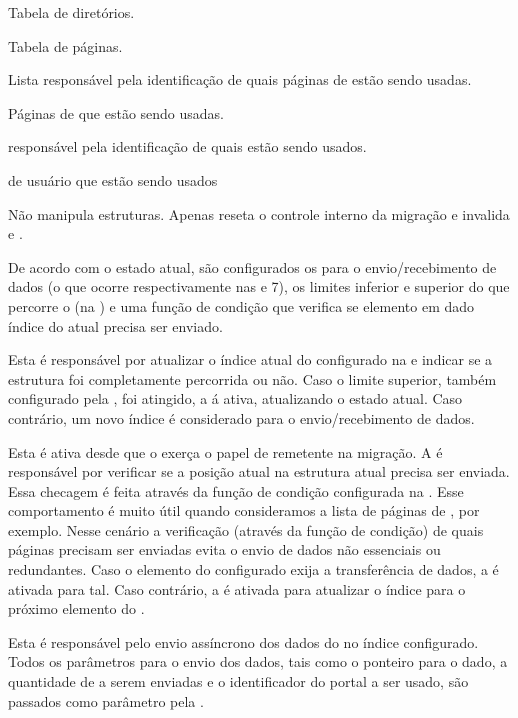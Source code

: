 \begin{description}[leftmargin=*,labelwidth=!,labelindent=0pt]
\begin{description}[leftmargin=!,labelwidth=\widthof{MSTATE\_FRAMES\_BITMAP \qquad}]
        \item [MSTATE\_PAGEDIR] Tabela de diretórios.
        \item [MSTATE\_PAGETAB] Tabela de páginas.
        \item [MSTATE\_KSTACKSIDS] Lista responsável pela identificação de quais páginas de  estão sendo usadas.
        \item [MSTATE\_KSTACKSPHYS] Páginas de  que estão sendo usadas.
        \item [MSTATE\_FRAMES\_BITMAP] \Bitmap responsável pela identificação de quais \frames estão sendo usados.
        \item [MSTATE\_FRAMES\_PHYS] \Frames de usuário que estão sendo usados
        \item [MSTATE\_FINISH] Não manipula estruturas. Apenas reseta o controle interno da migração e invalida \tlbs e \caches.
    \end{description}
    De acordo com o estado atual, são configurados os \buffers para o envio/recebimento de dados (o que ocorre respectivamente nas  e 7), os limites inferior e superior do \myloop que percorre o \buffer (na ) e uma função de condição que verifica se elemento em dado índice do \buffer atual precisa ser enviado.
    \item[5.] Esta \task é responsável por atualizar o índice atual do \buffer configurado na  e indicar se a estrutura foi completamente percorrida ou não. Caso o limite superior, também configurado pela , foi atingido, a  á ativa, atualizando o estado atual. Caso contrário, um novo índice é considerado para o envio/recebimento de dados.
    \item[6.] Esta \task é ativa desde que o \cluster exerça o papel de remetente na migração. A \task é responsável por verificar se a posição atual na estrutura atual precisa ser enviada. Essa checagem é feita através da função de condição configurada na . Esse comportamento é muito útil quando consideramos a lista de páginas de , por exemplo. Nesse cenário a verificação (através da função de condição) de quais páginas precisam ser enviadas evita o envio de dados não essenciais ou redundantes. Caso o elemento do \buffer configurado exija a transferência de dados, a  é ativada para tal. Caso contrário, a  é ativada para atualizar o índice para o próximo elemento do \buffer.
    \item[7.] Esta \task é responsável pelo envio assíncrono dos dados do \buffer no índice configurado. Todos os parâmetros para o envio dos dados, tais como o ponteiro para o dado, a quantidade de \bytes a serem enviadas e o identificador do portal a ser usado, são passados como parâmetro pela .

\end{description}
